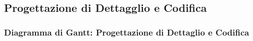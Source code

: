 \subsection{Progettazione di Dettagglio e Codifica}
\subsubsection{Diagramma di Gantt: Progettazione di Dettaglio e Codifica}
